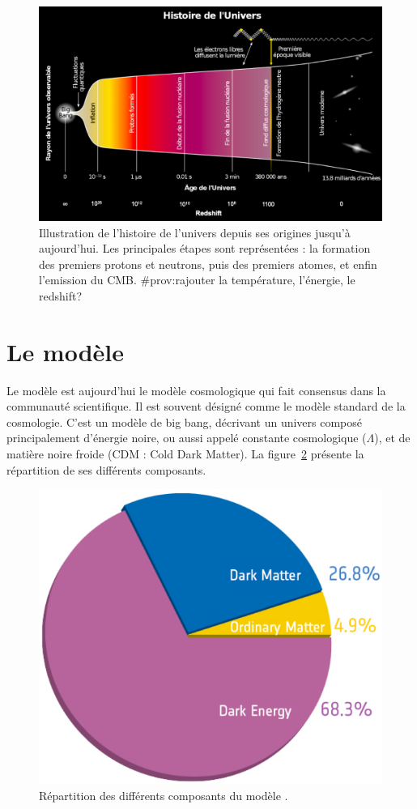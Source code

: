 \documentclass[11pt, twoside, a4paper, openright]{report}
\begin{document}
\begin{figure}
  \centering
  \includegraphics[scale=0.35]{univershistory2}
  \caption{Illustration de l'histoire de l'univers depuis ses origines jusqu'à aujourd'hui. Les principales étapes sont représentées : la formation des premiers protons et neutrons, puis des premiers atomes, et enfin l'emission du CMB. \#prov:rajouter la température, l'énergie, le redshift?}
  \label{fig:univershistory}
\end{figure}


\section{Le modèle \lcdm{}}

Le modèle \lcdm{} est aujourd'hui le modèle cosmologique qui fait consensus dans la communauté scientifique. Il est souvent désigné comme le modèle standard de la cosmologie. C'est un modèle de big bang, décrivant un univers composé principalement d'énergie noire, ou aussi appelé constante cosmologique ($\Lambda$), et de matière noire froide (CDM : Cold Dark Matter). La figure~\ref{fig:lcdm} présente la répartition de ses différents composants.
\begin{figure}
  \centering
  \includegraphics[scale=0.3]{lcdm}
  \caption{Répartition des différents composants du modèle \lcdm{}.}
  \label{fig:lcdm}
\end{figure}
\end{document}
